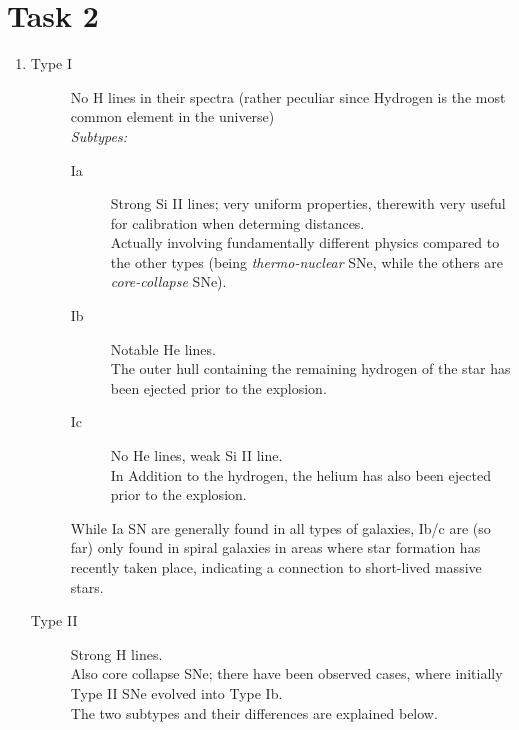 \documentclass[11pt,a4paper]{scrartcl}
\begin{document}
\section*{Task 2}

\begin{enumerate}[label=\textbf{\large(\alph*)}, itemsep=\baselineskip]

\item
    \begin{description}
        \item[Type I] No H lines in their spectra (rather peculiar since
            Hydrogen is the most common element in the universe) \\
            \emph{Subtypes:}
            \begin{description}
                \item[Ia] Strong Si II lines; very uniform properties,
                    therewith very useful for calibration when determing
                    distances. \\
                    Actually involving fundamentally different physics compared
                    to the other types (being \emph{thermo-nuclear} SNe, while
                    the others are \emph{core-collapse} SNe).
                \item[Ib] Notable He lines. \\
                    The outer hull containing the remaining hydrogen of the
                    star has been ejected prior to the explosion.
                \item[Ic] No He lines, weak Si II line. \\
                    In Addition to the hydrogen, the helium has also been
                    ejected prior to the explosion.
            \end{description}

            While Ia SN are generally found in all types of galaxies, Ib/c are
            (so far) only found in spiral galaxies in areas where star
            formation has recently taken place, indicating a connection to
            short-lived massive stars.

        \item[Type II] Strong H lines. \\
            Also core collapse SNe; there have been observed cases, where
            initially Type II SNe evolved into Type Ib. \\
            The two subtypes and their differences are explained below.
    \end{description}



\end{enumerate}
\end{document}
